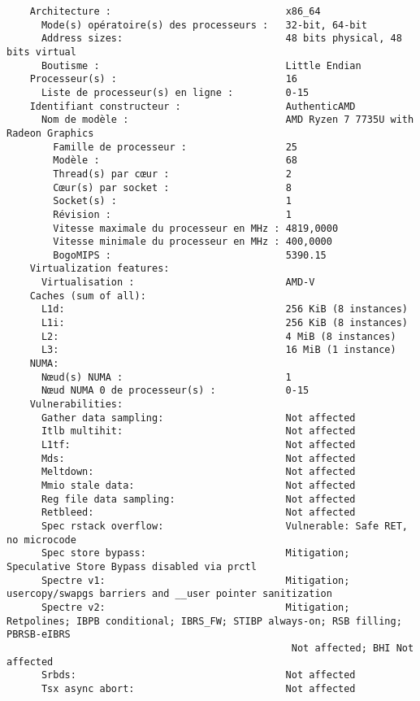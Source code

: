 \documentclass[a4paper, 12pt]{report}
\begin{document}
\begin{verbatim}
    Architecture :                              x86_64
      Mode(s) opératoire(s) des processeurs :   32-bit, 64-bit
      Address sizes:                            48 bits physical, 48 bits virtual
      Boutisme :                                Little Endian
    Processeur(s) :                             16
      Liste de processeur(s) en ligne :         0-15
    Identifiant constructeur :                  AuthenticAMD
      Nom de modèle :                           AMD Ryzen 7 7735U with Radeon Graphics
        Famille de processeur :                 25
        Modèle :                                68
        Thread(s) par cœur :                    2
        Cœur(s) par socket :                    8
        Socket(s) :                             1
        Révision :                              1
        Vitesse maximale du processeur en MHz : 4819,0000
        Vitesse minimale du processeur en MHz : 400,0000
        BogoMIPS :                              5390.15
    Virtualization features:                    
      Virtualisation :                          AMD-V
    Caches (sum of all):                        
      L1d:                                      256 KiB (8 instances)
      L1i:                                      256 KiB (8 instances)
      L2:                                       4 MiB (8 instances)
      L3:                                       16 MiB (1 instance)
    NUMA:                                       
      Nœud(s) NUMA :                            1
      Nœud NUMA 0 de processeur(s) :            0-15
    Vulnerabilities:                            
      Gather data sampling:                     Not affected
      Itlb multihit:                            Not affected
      L1tf:                                     Not affected
      Mds:                                      Not affected
      Meltdown:                                 Not affected
      Mmio stale data:                          Not affected
      Reg file data sampling:                   Not affected
      Retbleed:                                 Not affected
      Spec rstack overflow:                     Vulnerable: Safe RET, no microcode
      Spec store bypass:                        Mitigation; Speculative Store Bypass disabled via prctl
      Spectre v1:                               Mitigation; usercopy/swapgs barriers and __user pointer sanitization
      Spectre v2:                               Mitigation; Retpolines; IBPB conditional; IBRS_FW; STIBP always-on; RSB filling; PBRSB-eIBRS
                                                 Not affected; BHI Not affected
      Srbds:                                    Not affected
      Tsx async abort:                          Not affected
\end{verbatim}
\end{document}
